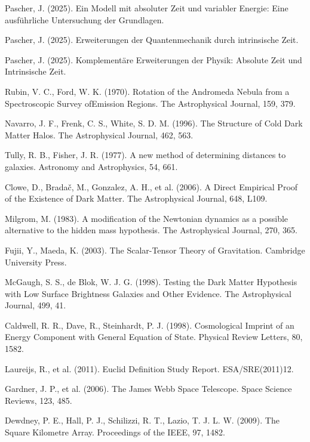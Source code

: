 \documentclass[a4paper,12pt]{article}
\begin{document}
	\begin{thebibliography}{99}
		
		 Pascher, J. (2025). Ein Modell mit absoluter Zeit und variabler Energie: Eine ausführliche Untersuchung der Grundlagen.
		
		 Pascher, J. (2025). Erweiterungen der Quantenmechanik durch intrinsische Zeit.
		
		 Pascher, J. (2025). Komplementäre Erweiterungen der Physik: Absolute Zeit und Intrinsische Zeit.
		
		 Rubin, V. C., Ford, W. K. (1970). Rotation of the Andromeda Nebula from a Spectroscopic Survey ofEmission Regions. The Astrophysical Journal, 159, 379.
		
		 Navarro, J. F., Frenk, C. S., White, S. D. M. (1996). The Structure of Cold Dark Matter Halos. The Astrophysical Journal, 462, 563.
		
		 Tully, R. B., Fisher, J. R. (1977). A new method of determining distances to galaxies. Astronomy and Astrophysics, 54, 661.
		
		 Clowe, D., Bradač, M., Gonzalez, A. H., et al. (2006). A Direct Empirical Proof of the Existence of Dark Matter. The Astrophysical Journal, 648, L109.
		
		 Milgrom, M. (1983). A modification of the Newtonian dynamics as a possible alternative to the hidden mass hypothesis. The Astrophysical Journal, 270, 365.
		
		 Fujii, Y., Maeda, K. (2003). The Scalar-Tensor Theory of Gravitation. Cambridge University Press.
		
		 McGaugh, S. S., de Blok, W. J. G. (1998). Testing the Dark Matter Hypothesis with Low Surface Brightness Galaxies and Other Evidence. The Astrophysical Journal, 499, 41.
		
		 Caldwell, R. R., Dave, R., Steinhardt, P. J. (1998). Cosmological Imprint of an Energy Component with General Equation of State. Physical Review Letters, 80, 1582.
		
		 Laureijs, R., et al. (2011). Euclid Definition Study Report. ESA/SRE(2011)12.
		
		 Gardner, J. P., et al. (2006). The James Webb Space Telescope. Space Science Reviews, 123, 485.
		
		 Dewdney, P. E., Hall, P. J., Schilizzi, R. T., Lazio, T. J. L. W. (2009). The Square Kilometre Array. Proceedings of the IEEE, 97, 1482.
		
		\end{thebibliography}
		
	
\end{document}
